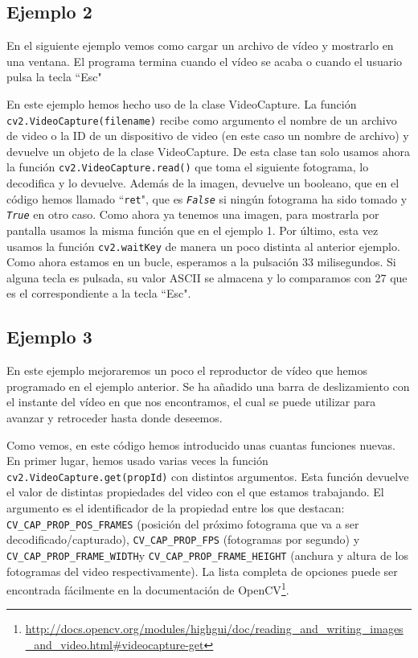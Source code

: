 \documentclass[a4paper,openright, 12pt]{book}
\begin{document}
\subsection*{Ejemplo 2}
\enlargethispage{2cm}
En el siguiente ejemplo vemos como cargar un archivo de vídeo y mostrarlo en una ventana. El programa termina cuando el vídeo se acaba o cuando el usuario pulsa la tecla ``Esc"

En este ejemplo hemos hecho uso de la clase VideoCapture.
La función \lstinline|cv2.VideoCapture(filename)| recibe como argumento el nombre de un archivo de video o la ID de un dispositivo de video (en este caso un nombre de archivo) y devuelve un objeto de la clase VideoCapture.
De esta clase tan solo usamos ahora la función \lstinline|cv2.VideoCapture.read()| que toma el siguiente fotograma, lo decodifica y lo devuelve. Además de la imagen, devuelve un booleano, que en el código hemos llamado ``\lstinline|ret|", que es \textit{\lstinline|False|} si ningún fotograma ha sido tomado y \textit{\lstinline|True|} en otro caso.
Como ahora ya tenemos una imagen, para mostrarla por pantalla usamos la misma función que en el ejemplo 1.
Por último, esta vez usamos la función \lstinline|cv2.waitKey| de manera un poco distinta al anterior ejemplo. Como ahora estamos en un bucle, esperamos a la pulsación 33 milisegundos. Si alguna tecla es pulsada, su valor ASCII se almacena y lo comparamos con 27 que es el correspondiente a la tecla ``Esc".

\newpage
\subsection*{Ejemplo 3}
En este ejemplo mejoraremos un poco el reproductor de vídeo que hemos programado en el ejemplo anterior. Se ha añadido una barra de deslizamiento con el instante del vídeo en que nos encontramos, el cual se puede utilizar para avanzar y retroceder hasta donde deseemos.

Como vemos, en este código hemos introducido unas cuantas funciones nuevas.
En primer lugar, hemos usado varias veces la función \lstinline|cv2.VideoCapture.get(propId)| con distintos argumentos.
Esta función devuelve el valor de distintas propiedades del video con el que estamos trabajando. El argumento es el identificador de la propiedad entre los que destacan: \lstinline|CV_CAP_PROP_POS_FRAMES| (posición del próximo fotograma que va a ser decodificado/capturado), \lstinline|CV_CAP_PROP_FPS| (fotogramas por segundo) y \lstinline|CV_CAP_PROP_FRAME_WIDTH|y \lstinline|CV_CAP_PROP_FRAME_HEIGHT| (anchura y altura de los fotogramas del video respectivamente).
La lista completa de opciones puede ser encontrada fácilmente en la documentación de OpenCV\footnote{\url{http://docs.opencv.org/modules/highgui/doc/reading_and_writing_images_and_video.html\#videocapture-get}}.
\end{document}

